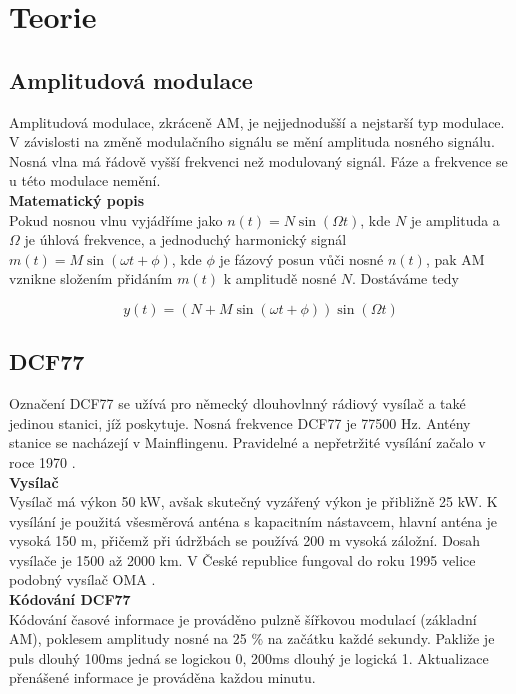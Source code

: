 \section{Teorie}
\subsection{Amplitudová modulace}
    Amplitudová modulace, zkráceně AM, je nejjednodušší a nejstarší typ modulace. V
    závislosti na změně modulačního signálu se mění amplituda nosného signálu.
    Nosná vlna má řádově vyšší frekvenci než modulovaný signál. Fáze a frekvence se u této
    modulace nemění.
\\

    \textbf{Matematický popis}
\\

    Pokud nosnou vlnu vyjádříme jako $n(t) = N \sin{(\Omega t)}$, kde $N$ je amplituda a
    $\Omega$ je úhlová frekvence, a jednoduchý harmonický signál $m(t) = M \sin{(\omega t
    + \phi)}$, kde $\phi$ je fázový posun vůči nosné $n(t)$, pak AM vznikne složením
    přidáním $m(t)$ k amplitudě nosné $N$. Dostáváme tedy

    \begin{equation}
        y(t) = (N+M \sin{(\omega t +\phi)})\sin{(\Omega t)}
    \end{equation}
\subsection{DCF77}
    Označení DCF77 se užívá pro německý dlouhovlnný rádiový vysílač a také jedinou
    stanici, jíž poskytuje. Nosná frekvence DCF77 je 77500 Hz. Antény stanice se nacházejí
    v Mainflingenu. Pravidelné a nepřetržité vysílání začalo v roce 1970 \cite{dcf77}.
\\

    \textbf{Vysílač}
\\

    Vysílač má výkon 50 kW, avšak skutečný vyzářený výkon je přibližně 25 kW. K vysílání
    je použitá všesměrová anténa s kapacitním nástavcem, hlavní anténa je vysoká 150 m,
    přičemž při údržbách se používá 200 m vysoká záložní. Dosah vysílače je 1500 až 2000
    km. V České republice fungoval do roku 1995 velice podobný vysílač OMA \cite{dcf}.
\\

    \textbf{Kódování DCF77}
\\

    Kódování časové informace je prováděno pulzně šířkovou modulací (základní AM), poklesem amplitudy
    nosné na 25 \% na začátku každé sekundy. Pakliže je puls dlouhý 100ms jedná se
    logickou 0, 200ms dlouhý je logická 1. Aktualizace přenášené informace je prováděna
    každou minutu.

